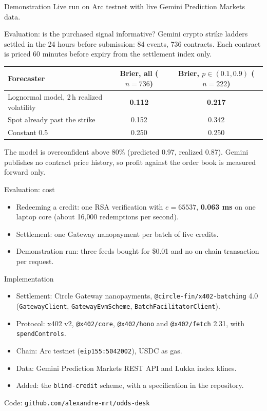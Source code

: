 \documentclass[aspectratio=169,11pt]{beamer}
\begin{document}
\begin{frame}{Demonstration}
  \centering
  \vfill
  Live run on Arc testnet with live Gemini Prediction Markets data.
  \vfill
\end{frame}

\begin{frame}{Evaluation: is the purchased signal informative?}
  Gemini crypto strike ladders settled in the 24 hours before submission: 84 events, 736 contracts. Each contract is priced 60 minutes before expiry from the settlement index only.
  \medskip

  \centering
  \small
  \begin{tabular}{@{}lcc@{}}
    \toprule
    Forecaster & Brier, all ($n=736$) & Brier, $p \in (0.1, 0.9)$ ($n=222$) \\
    \midrule
    Lognormal model, 2\,h realized volatility & \textbf{0.112} & \textbf{0.217} \\
    Spot already past the strike & 0.152 & 0.342 \\
    Constant 0.5 & 0.250 & 0.250 \\
    \bottomrule
  \end{tabular}
  \medskip

  \raggedright
  The model is overconfident above 80\% (predicted 0.97, realized 0.87). Gemini publishes no contract price history, so profit against the order book is measured forward only.
\end{frame}

\begin{frame}{Evaluation: cost}
  \begin{itemize}
    \item Redeeming a credit: one RSA verification with $e = 65537$, \textbf{0.063 ms} on one laptop core (about 16{,}000 redemptions per second).
    \item Settlement: one Gateway nanopayment per batch of five credits.
    \item Demonstration run: three feeds bought for \$0.01 and no on-chain transaction per request.
  \end{itemize}
\end{frame}

\begin{frame}{Implementation}
  \begin{itemize}
    \item Settlement: Circle Gateway nanopayments, \texttt{@circle-fin/x402-batching} 4.0 (\texttt{GatewayClient}, \texttt{GatewayEvmScheme}, \texttt{BatchFacilitatorClient}).
    \item Protocol: x402 v2, \texttt{@x402/core}, \texttt{@x402/hono} and \texttt{@x402/fetch} 2.31, with \texttt{spendControls}.
    \item Chain: Arc testnet (\texttt{eip155:5042002}), USDC as gas.
    \item Data: Gemini Prediction Markets REST API and Lukka index klines.
    \item Added: the \texttt{blind-credit} scheme, with a specification in the repository.
  \end{itemize}
  \medskip
  Code: \texttt{github.com/alexandre-mrt/odds-desk}
\end{frame}
\end{document}
